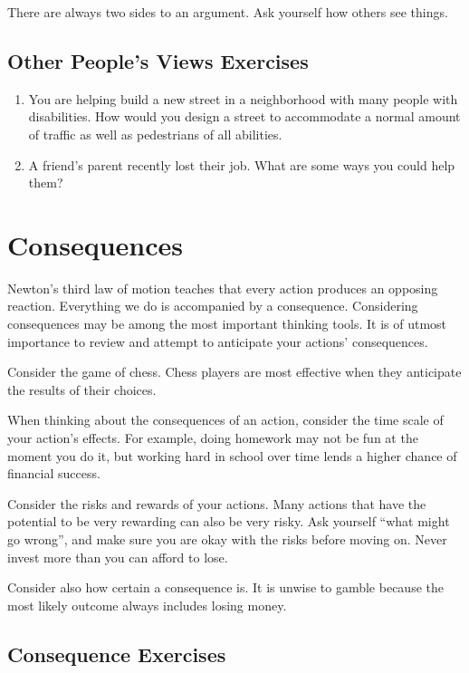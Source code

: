 There are always two sides to an argument. Ask yourself how others see things.

\section*{Other People's Views Exercises}

\begin{enumerate}
	\item You are helping build a new street in a neighborhood with many people with disabilities. How would you design a street to accommodate a normal amount of traffic as well as pedestrians of all abilities.
	\item A friend's parent recently lost their job. What are some ways you could help them?
\end{enumerate}


\chapter{Consequences}


Newton's third law of motion teaches that every action produces an opposing reaction. Everything we do is accompanied by a consequence. Considering consequences may be among the most important thinking tools. It is of utmost importance to review and attempt to anticipate your actions' consequences.

Consider the game of chess. Chess players are most effective when they anticipate the results of their choices. 

When thinking about the consequences of an action, consider the time scale of your action's effects. For example, doing homework may not be fun at the moment you do it, but working hard in school over time lends a higher chance of financial success.

Consider the risks and rewards of your actions. Many actions that have the potential to be very rewarding can also be very risky. Ask yourself ``what might go wrong'', and make sure you are okay with the risks before moving on. Never invest more than you can afford to lose.

Consider also how certain a consequence is. It is unwise to gamble because the most likely outcome always includes losing money.

\section*{Consequence Exercises}

